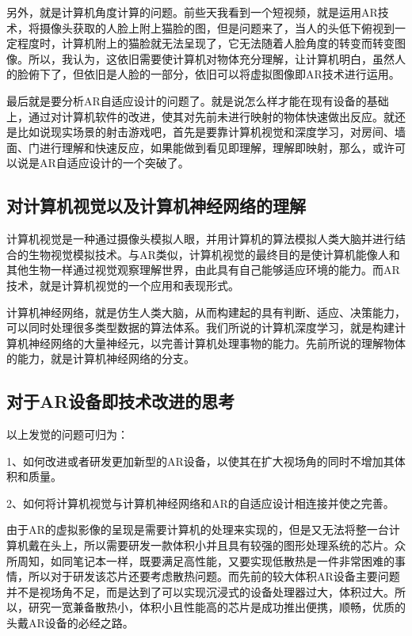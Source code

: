 \documentclass{article}
\begin{document}
另外，就是计算机角度计算的问题。前些天我看到一个短视频，就是运用AR技术，将摄像头获取的人脸上附上猫脸的图，但是问题来了，当人的头低下俯视到一定程度时，计算机附上的猫脸就无法呈现了，它无法随着人脸角度的转变而转变图像。所以，我认为，这依旧需要使计算机对物体充分理解，让计算机明白，虽然人的脸俯下了，但依旧是人脸的一部分，依旧可以将虚拟图像即AR技术进行运用。\par

最后就是要分析AR自适应设计的问题了。就是说怎么样才能在现有设备的基础上，通过对计算机软件的改进，使其对先前未进行映射的物体快速做出反应。就还是比如说现实场景的射击游戏吧，首先是要靠计算机视觉和深度学习，对房间、墙面、门进行理解和快速反应，如果能做到看见即理解，理解即映射，那么，或许可以说是AR自适应设计的一个突破了。\par

\subsection{对计算机视觉以及计算机神经网络的理解}
计算机视觉是一种通过摄像头模拟人眼，并用计算机的算法模拟人类大脑并进行结合的生物视觉模拟技术。与AR类似，计算机视觉的最终目的是使计算机能像人和其他生物一样通过视觉观察理解世界，由此具有自己能够适应环境的能力。而AR技术，就是计算机视觉的一个应用和表现形式。\par

计算机神经网络，就是仿生人类大脑，从而构建起的具有判断、适应、决策能力，可以同时处理很多类型数据的算法体系。我们所说的计算机深度学习，就是构建计算机神经网络的大量神经元，以完善计算机处理事物的能力。先前所说的理解物体的能力，就是计算机神经网络的分支。\par

\subsection{对于AR设备即技术改进的思考}
以上发觉的问题可归为：

1、如何改进或者研发更加新型的AR设备，以使其在扩大视场角的同时不增加其体积和质量。

2、如何将计算机视觉与计算机神经网络和AR的自适应设计相连接并使之完善。

由于AR的虚拟影像的呈现是需要计算机的处理来实现的，但是又无法将整一台计算机戴在头上，所以需要研发一款体积小并且具有较强的图形处理系统的芯片。众所周知，如同笔记本一样，既要满足高性能，又要实现低散热是一件非常困难的事情，所以对于研发该芯片还要考虑散热问题。而先前的较大体积AR设备主要问题并不是视场角不足，而是达到了可以实现沉浸式的设备处理器过大，体积过大。所以，研究一宽兼备散热小，体积小且性能高的芯片是成功推出便携，顺畅，优质的头戴AR设备的必经之路。\par
\end{document}
